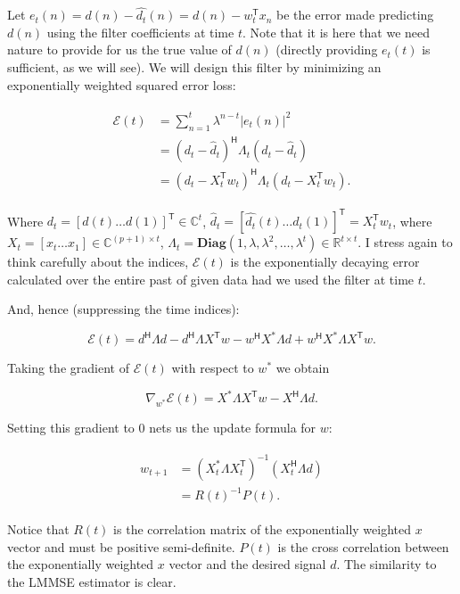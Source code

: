 \documentclass[a4paper, 12pt]{article}
\def\T{\mathsf{T}}
\def\H{\mathsf{H}}
\begin{document}
Let $e_t(n) = d(n) - \hat{d_t}(n) = d(n) - w_t^\T x_n$ be the error made predicting $d(n)$ using the filter coefficients at time $t$.  Note that it is here that we need nature to provide for us the true value of $d(n)$ (directly providing $e_t(t)$ is sufficient, as we will see).  We will design this filter by minimizing an exponentially weighted squared error loss:

\begin{align}
\begin{split}
\label{eq:loss}
  \mathcal{E}(t) &= \sum_{n = 1}^{t}\lambda^{n - t}|e_t(n)|^2 \\
  &= (d_t - \hat{d}_t)^\H \Lambda_t (d_t - \hat{d}_t) \\
  &= (d_t - X_t^\T w_t)^\H \Lambda_t (d_t - X_t^\T w_t).
\end{split}
\end{align}

Where $d_t = [d(t) \ldots d(1)]^\T \in \mathbb{C}^t$, $\hat{d}_t = [\hat{d_t}(t) \ldots \hat{d_t}(1)]^\T = X_t^\T w_t$, where $X_t = [x_t \ldots x_1] \in \mathbb{C}^{(p + 1) \times t}$, $\Lambda_t = \textbf{Diag}(1, \lambda, \lambda^2, \ldots, \lambda^t) \in \mathbb{R}^{t \times t}$.  I stress again to think carefully about the indices, $\mathcal{E}(t)$ is the exponentially decaying error calculated over the entire past of given data had we used the filter at time $t$.

And, hence (suppressing the time indices):

$$
\mathcal{E}(t) = d^\H \Lambda d - d^\H\Lambda X^\T w - w^\H X^* \Lambda d + w^\H X^* \Lambda X^\T w.
$$

Taking the gradient of $\mathcal{E}(t)$ with respect to $w^*$ we obtain

$$
\nabla_{w^*}\mathcal{E}(t) = X^* \Lambda X^\T w - X^\H \Lambda d.
$$

Setting this gradient to $0$ nets us the update formula for $w$:

\begin{align}
\begin{split}
\label{eq:w_update}
  w_{t + 1} &= (X_t^* \Lambda X_t^\T)^{-1}(X_t^\H \Lambda d) \\
  &= R(t)^{-1}P(t).
\end{split}
\end{align}

Notice that $R(t)$ is the correlation matrix of the exponentially weighted $x$ vector and must be positive semi-definite.  $P(t)$ is the cross correlation between the exponentially weighted $x$ vector and the desired signal $d$.  The similarity to the LMMSE estimator is clear.
\end{document}
